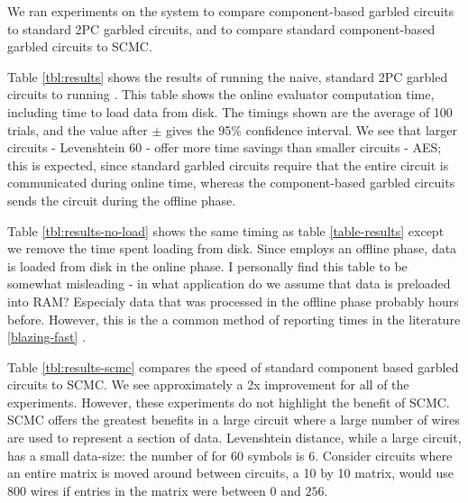 We ran experiments on the \CompGC system to compare component-based garbled circuits to standard 2PC garbled circuits, and to compare standard component-based garbled circuits to SCMC.

Table \ref{tbl:results} shows the results of running the naive, standard 2PC garbled circuits to running \CompGC.
This table shows the online evaluator computation time, including time to load data from disk. 
The timings shown are the average of 100 trials, and the value after $\pm$ gives the 95\% confidence interval.
We see that larger circuits - Levenshtein 60 - offer more time savings than smaller circuits - AES; this is expected, since standard garbled circuits require that the entire circuit is communicated during online time, whereas the component-based garbled circuits sends the circuit during the offline phase. 

Table \ref{tbl:results-no-load} shows the same timing as table \ref{table-results} except we remove the time spent loading from disk.
Since \CompGC employs an offline phase, data is loaded from disk in the online phase. 
I personally find this table to be somewhat misleading - in what application do we assume that data is preloaded into RAM?
Especialy data that was processed in the offline phase probably hours before.
However, this is the a common method of reporting times in the literature \ref{blazing-fast} .

Table \ref{tbl:results-scmc} compares the speed of standard component based garbled circuits to SCMC.
We see approximately a 2x improvement for all of the experiments. 
However, these experiments do not highlight the benefit of SCMC. 
SCMC offers the greatest benefits in a large circuit where a large number of wires are used to represent a section of data.
Levenshtein distance, while a large circuit, has a small data-size: the number of for 60 symbols is 6.
Consider circuits where an entire matrix is moved around between circuits, a 10 by 10 matrix, would use $800$ wires if entries in the matrix were between $0$ and $256$.


\newpage



\newpage


